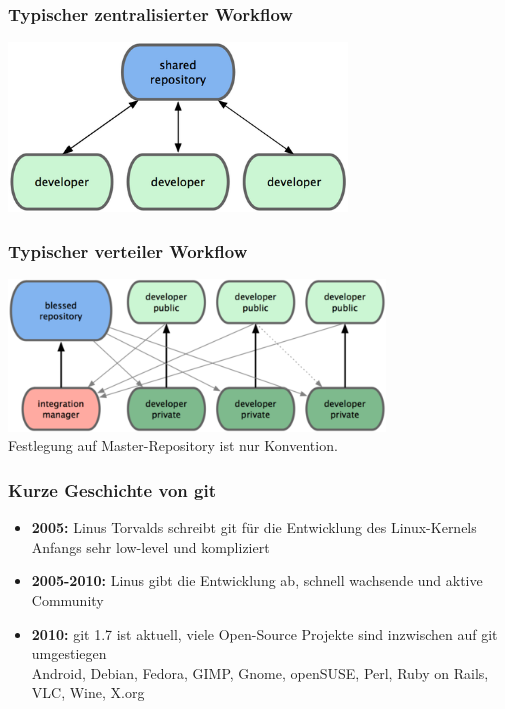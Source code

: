 \begin{frame}
  \frametitle{Typischer zentralisierter Workflow}
  \begin{center}
    \includegraphics[width=9cm]{img/centralized_workflow.png}
  \end{center}
\end{frame}

\begin{frame}
  \frametitle{Typischer verteiler Workflow}
  \begin{center}
    \includegraphics[width=10cm]{img/distributed_workflow.png} \\
    \vspace{0.5cm}
    Festlegung auf Master-Repository ist nur Konvention.
  \end{center}
\end{frame}

\begin{frame}
  \frametitle{Kurze Geschichte von git}
  \begin{itemize}
    \item {\bf 2005:} Linus Torvalds schreibt git für die Entwicklung des Linux-Kernels \\ Anfangs sehr low-level und kompliziert
    \item {\bf 2005-2010:} Linus gibt die Entwicklung ab, schnell wachsende und aktive Community
    \item {\bf 2010:} git 1.7 ist aktuell, viele Open-Source Projekte sind inzwischen auf git umgestiegen \\ Android, Debian, Fedora, GIMP, Gnome, openSUSE, Perl, Ruby on Rails, VLC, Wine, X.org
    \end{itemize}
\end{frame}

